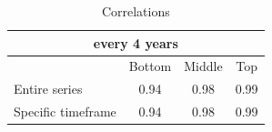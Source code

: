 \begin{table}[h!]
\centering
\caption{Correlations}
\begin{tabular}{|l|c|c|c|}
\hline
\multicolumn{4}{|c|}{every 4 years} \\ \hline
& Bottom & Middle & Top \\ \hline
Entire series & 0.94 & 0.98 & 0.99 \\ \hline
Specific timeframe & 0.94 & 0.98 & 0.99 \\ \hline
\end{tabular}
\end{table}
